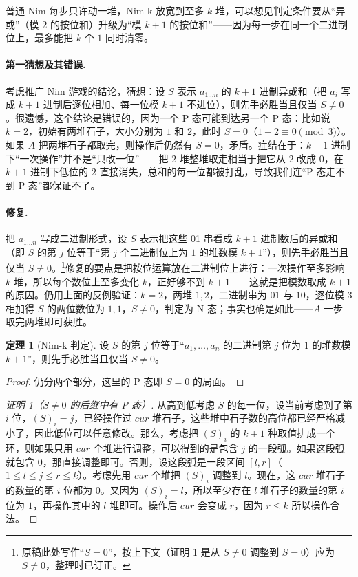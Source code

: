 \documentclass[UTF8,a4paper,11pt,oneside,openany,fontset=fandol]{ctexbook}
\theoremstyle{definition}
\newtheorem{theorem}[definition]{定理}
\begin{document}
普通 Nim 每步只许动一堆，Nim-k 放宽到至多 $k$ 堆，可以想见判定条件要从“异或”（模 $2$ 的按位和）升级为“模 $k+1$ 的按位和”——因为每一步在同一个二进制位上，最多能把 $k$ 个 $1$ 同时清零。

\paragraph{第一猜想及其错误.} 考虑推广 Nim 游戏的结论，猜想：设 $S$ 表示 $a_{1\ldots n}$ 的 $k+1$ 进制异或和（把 $a_i$ 写成 $k+1$ 进制后逐位相加、每一位模 $k+1$ 不进位），则先手必胜当且仅当 $S\ne0$。很遗憾，这个结论是错误的，因为一个 P 态可能到达另一个 P 态：比如说 $k=2$，初始有两堆石子，大小分别为 $1$ 和 $2$，此时 $S=0$（$1+2\equiv0\pmod 3$）。如果 $A$ 把两堆石子都取完，则操作后仍然有 $S=0$，矛盾。症结在于：$k+1$ 进制下“一次操作”并不是“只改一位”——把 $2$ 堆整堆取走相当于把它从 $2$ 改成 $0$，在 $k+1$ 进制下低位的 $2$ 直接消失，总和的每一位都被打乱，导致我们连“P 态走不到 P 态”都保证不了。

\paragraph{修复.} 把 $a_{1\ldots n}$ 写成二进制形式，设 $S$ 表示把这些 01 串看成 $k+1$ 进制数后的异或和（即 $S$ 的第 $j$ 位等于“第 $j$ 个二进制位上为 $1$ 的堆数模 $k+1$”），则先手必胜当且仅当 $S\ne0$。\footnote{原稿此处写作“$S=0$”，按上下文（证明 1 是从 $S\ne0$ 调整到 $S=0$）应为 $S\ne0$，整理时已订正。}修复的要点是把按位运算放在二进制位上进行：一次操作至多影响 $k$ 堆，所以每个数位上至多变化 $k$，正好够不到 $k+1$——这就是把模数取成 $k+1$ 的原因。仍用上面的反例验证：$k=2$，两堆 $1,2$，二进制串为 $01$ 与 $10$，逐位模 $3$ 相加得 $S$ 的两位数位为 $1,1$，$S\ne0$，判定为 N 态；事实也确是如此——$A$ 一步取完两堆即可获胜。

\begin{theorem}[Nim-k 判定]\label{thm:nimk}
设 $S$ 的第 $j$ 位等于“$a_1,\ldots,a_n$ 的二进制第 $j$ 位为 $1$ 的堆数模 $k+1$”，则先手必胜当且仅当 $S\ne0$。
\end{theorem}
\begin{proof}
仍分两个部分，这里的 P 态即 $S=0$ 的局面。
\end{proof}

\begin{proof}[证明 1（$S\ne0$ 的后继中有 P 态）]
从高到低考虑 $S$ 的每一位，设当前考虑到了第 $i$ 位，$(S)_i=j$，已经操作过 $cur$ 堆石子，这些堆中石子数的高位都已经严格减小了，因此低位可以任意修改。那么，考虑把 $(S)_i$ 的 $k+1$ 种取值排成一个环，则如果只用 $cur$ 个堆进行调整，可以得到的是包含 $j$ 的一段弧。如果这段弧就包含 $0$，那直接调整即可。否则，设这段弧是一段区间 $[l,r]$（$1\le l\le j\le r\le k$）。考虑先用 $cur$ 个堆把 $(S)_i$ 调整到 $l$。现在，这 $cur$ 堆石子的数量的第 $i$ 位都为 $0$。又因为 $(S)_i=l$，所以至少存在 $l$ 堆石子的数量的第 $i$ 位为 $1$，再操作其中的 $l$ 堆即可。操作后 $cur$ 会变成 $r$，因为 $r\le k$ 所以操作合法。
\end{proof}
\end{document}
